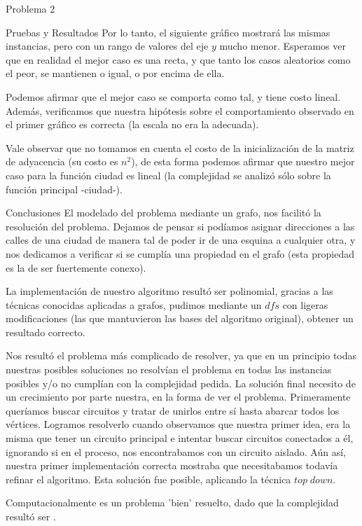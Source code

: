 \begin{section}{Problema 2}
\begin{subsection}{Pruebas y Resultados}
		Por lo tanto, el siguiente gráfico mostrará las mismas instancias, pero con un rango de valores del eje $y$ mucho menor. Esperamos ver que en realidad el mejor caso es una recta, y que tanto los casos aleatorios como el peor, se mantienen o igual, o por encima de ella.


		Podemos afirmar que el mejor caso se comporta como tal, y tiene costo lineal. Además, verificamos que nuestra hipótesis sobre el comportamiento observado en el primer gráfico es correcta (la escala no era la adecuada).

		Vale observar que no tomamos en cuenta el costo de la inicialización de la matriz de adyacencia (su costo es $n^2$), de esta forma podemos afirmar que nuestro mejor caso para la función ciudad es lineal (la complejidad se analizó sólo sobre la función principal -ciudad-).

	\end{subsection}

	\begin{subsection}{Conclusiones}
		El modelado del problema mediante un grafo, nos facilitó la resolución del problema. Dejamos de pensar si podíamos asignar direcciones a las calles de una ciudad de manera tal de poder ir de una esquina a cualquier otra, y nos dedicamos a verificar si se cumplía una propiedad en el grafo (esta propiedad es la de ser fuertemente conexo).

		La implementación de nuestro algoritmo resultó ser polinomial, gracias a las técnicas conocidas aplicadas a grafos, pudimos mediante un $dfs$ con ligeras modificaciones (las que mantuvieron las bases del algoritmo original), obtener un resultado correcto. 

		Nos resultó el problema más complicado de resolver, ya que en un principio todas nuestras posibles soluciones no resolvían el problema en todas las instancias posibles y/o no cumplían con la complejidad pedida. La solución final necesito de un crecimiento por parte nuestra, en la forma de ver el problema. Primeramente queríamos buscar circuitos y tratar de unirlos entre sí hasta abarcar todos los vértices. Logramos resolverlo cuando observamos que nuestra primer idea, era la misma que tener un circuito principal e intentar buscar circuitos conectados a él, ignorando si en el proceso, nos encontrabamos con un circuito aislado. Aún así, nuestra primer implementación correcta mostraba que necesitabamos todavía refinar el algoritmo. Esta solución fue posible, aplicando la técnica $top\;down$.

		Computacionalmente es un problema 'bien' resuelto, dado que la complejidad resultó ser .

	\end{subsection}
\end{section}

